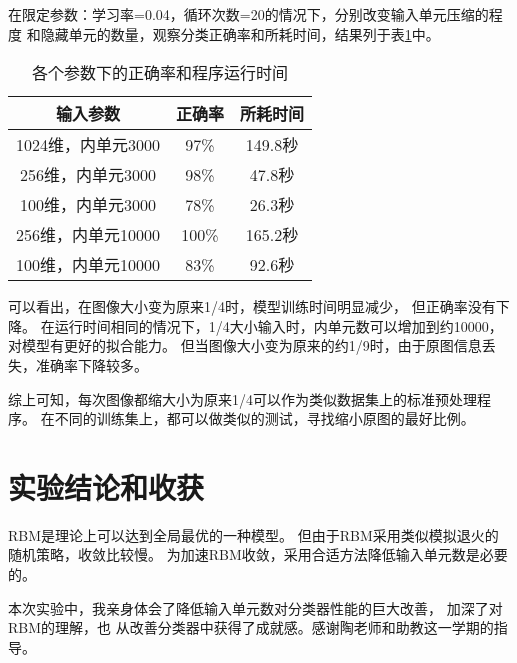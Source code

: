 \documentclass{ctexart}
\begin{document}
在限定参数：学习率=0.04，循环次数=20的情况下，分别改变输入单元压缩的程度
和隐藏单元的数量，观察分类正确率和所耗时间，结果列于表\ref{1}中。

\begin{table}[htbp]
	\centering
	\caption{各个参数下的正确率和程序运行时间}
	\label{1}
	\vspace{0.5em}
	\begin{tabular}{ccc}
		\toprule
		输入参数 & 正确率 & 所耗时间 \\
		\midrule
		1024维，内单元3000 & 97\% & 149.8秒\\
		256维，内单元3000 & 98\% & 47.8秒\\
		100维，内单元3000 & 78\% & 26.3秒\\
		\midrule
		256维，内单元10000 & 100\% & 165.2秒\\
		100维，内单元10000 & 83\% & 92.6秒\\
		\bottomrule
	\end{tabular}
\end{table}

可以看出，在图像大小变为原来1/4时，模型训练时间明显减少，
但正确率没有下降。
在运行时间相同的情况下，1/4大小输入时，内单元数可以增加到约10000，
对模型有更好的拟合能力。
但当图像大小变为原来的约1/9时，由于原图信息丢失，准确率下降较多。

综上可知，每次图像都缩大小为原来1/4可以作为类似数据集上的标准预处理程序。
在不同的训练集上，都可以做类似的测试，寻找缩小原图的最好比例。

\section{实验结论和收获}
RBM是理论上可以达到全局最优的一种模型。
但由于RBM采用类似模拟退火的随机策略，收敛比较慢。
为加速RBM收敛，采用合适方法降低输入单元数是必要的。

本次实验中，我亲身体会了降低输入单元数对分类器性能的巨大改善，
加深了对RBM的理解，也
从改善分类器中获得了成就感。感谢陶老师和助教这一学期的指导。
\end{document}
